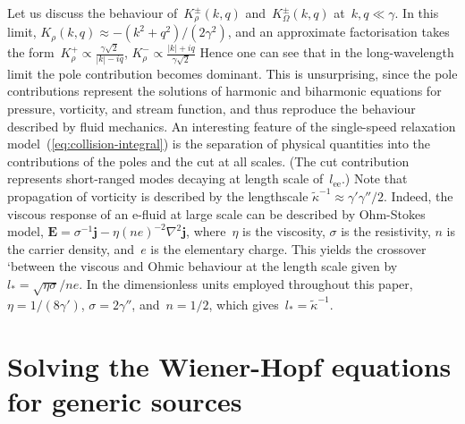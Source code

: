 \documentclass[preprint,aps,eqsecnum]{revtex4-1}
\newcommand{\fplus}[1]{{#1}^{+}}
\newcommand{\fminus}[1]{{#1}^{-}}
\newcommand{\fplusminus}[1]{{#1}^{\pm}}
\begin{document}
Let us discuss the behaviour of~$\fplusminus{K}_\rho(k, q)$
and~$\fplusminus{K}_\Omega(k, q)$ at~$k, q \ll \gamma$. In this limit,
$K_\rho(k, q)  \approx -  (k^2 + q^2)/(2\gamma^2)$, and an approximate
factorisation takes
the form~$\fplus{K}_\rho \propto \frac{\gamma \sqrt{2}}{|k| - i q}$,
$\fminus{K}_\rho \propto \frac{|k| + i q}{\gamma \sqrt{2}}$
Hence one can see that in the
long-wavelength limit the pole contribution becomes dominant.
This is unsurprising,
since the pole contributions
represent the solutions of harmonic and biharmonic equations for
pressure, vorticity, and stream function, and thus reproduce
the behaviour described by fluid mechanics. An interesting feature
of the single-speed relaxation model~(\ref{eq:collision-integral}) is the
separation of physical quantities into the contributions of the
poles and the cut at all scales. (The cut contribution represents
short-ranged modes decaying at length scale of~$l_\mathrm{ee}$.)
Note that propagation of vorticity is described by the lengthscale
${\tilde \kappa}^{-1} \approx \gamma' \gamma'' / 2$. Indeed, the viscous
response of an e-fluid at large scale can be described by Ohm-Stokes model,
${\bm E} = \sigma^{-1}  {\bm j} - \eta (ne)^{-2} \nabla^2 {\bm j}$,
where~$\eta$ is the viscosity, $\sigma$ is the resistivity, $n$
is the carrier density, and~$e$ is the elementary charge.
This yields
the  crossover `between the viscous and Ohmic behaviour at the
length scale given
by~$l_\ast = \sqrt{\eta \sigma} / ne$. In the dimensionless units
employed throughout this paper,
$\eta = 1/(8 \gamma')$, $\sigma = 2\gamma''$, and~$n = 1/2$, which
gives~$l_\ast = {\tilde \kappa}^{-1}$.

\section{Solving the Wiener-Hopf equations for generic sources}
\label{sec:wh-solution}
\end{document}
